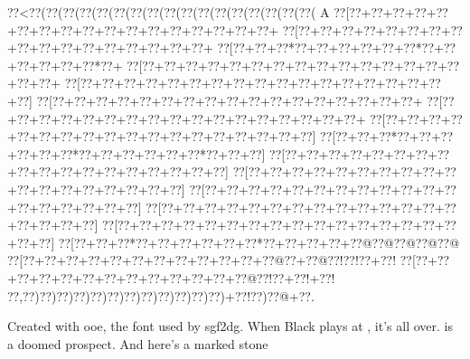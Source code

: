 \documentclass[a5paper]{article}
\begin{document}
\newpage
\begin{center}
{\bgoo
\0??<\0??(\0??(\0??(\0??(\0??(\0??(\0??(\0??(\0??(\0??(\0??(\0??(\0??(\0??(\0??(\0??(\0??(\!  A
\0??[\0??+\0??+\0??+\0??+\0??+\0??+\0??+\0??+\0??+\0??+\0??+\0??+\0??+\0??+\0??+\0??+\0??+
\0??[\0??+\0??+\0??+\0??+\0??+\0??+\0??+\0??+\0??+\0??+\0??+\0??+\0??+\0??+\0??+\0??+\0??+
\0??[\0??+\0??+\0??*\0??+\0??+\0??+\0??+\0??+\0??*\0??+\0??+\0??+\0??+\0??+\0??*\0??+
\0??[\0??+\0??+\0??+\0??+\0??+\0??+\0??+\0??+\0??+\0??+\0??+\0??+\0??+\0??+\0??+\0??+\0??+
\0??[\0??+\0??+\0??+\0??+\0??+\0??+\0??+\0??+\0??+\0??+\0??+\0??+\0??+\0??+\0??+\0??+\0??+\0??]
\0??[\0??+\0??+\0??+\0??+\0??+\0??+\0??+\0??+\0??+\0??+\0??+\0??+\0??+\0??+\0??+\0??+\0??+
\0??[\0??+\0??+\0??+\0??+\0??+\0??+\0??+\0??+\0??+\0??+\0??+\0??+\0??+\0??+\0??+\0??+\0??+
\0??[\0??+\0??+\0??+\0??+\0??+\0??+\0??+\0??+\0??+\0??+\0??+\0??+\0??+\0??+\0??+\0??+\0??+\0??]
\0??[\0??+\0??+\0??*\0??+\0??+\0??+\0??+\0??+\0??*\0??+\0??+\0??+\0??+\0??+\0??*\0??+\0??+\0??]
\0??[\0??+\0??+\0??+\0??+\0??+\0??+\0??+\0??+\0??+\0??+\0??+\0??+\0??+\0??+\0??+\0??+\0??+\0??]
\0??[\0??+\0??+\0??+\0??+\0??+\0??+\0??+\0??+\0??+\0??+\0??+\0??+\0??+\0??+\0??+\0??+\0??+\0??]
\0??[\0??+\0??+\0??+\0??+\0??+\0??+\0??+\0??+\0??+\0??+\0??+\0??+\0??+\0??+\0??+\0??+\0??+\0??]
\0??[\0??+\0??+\0??+\0??+\0??+\0??+\0??+\0??+\0??+\0??+\0??+\0??+\0??+\0??+\0??+\0??+\0??+\0??]
\0??[\0??+\0??+\0??+\0??+\0??+\0??+\0??+\0??+\0??+\0??+\0??+\0??+\0??+\0??+\0??+\0??+\0??+\0??]
\0??[\0??+\0??+\0??*\0??+\0??+\0??+\0??+\0??+\0??*\0??+\0??+\0??+\0??+\0??@\0??@\0??@\0??@\0??@
\0??[\0??+\0??+\0??+\0??+\0??+\0??+\0??+\0??+\0??+\0??+\0??+\0??@\0??+\0??@\0??!\0??!\0??+\0??!
\0??[\0??+\0??+\0??+\0??+\0??+\0??+\0??+\0??+\0??+\0??+\0??+\0??+\0??@\0??!\0??+\0??!+\0??!
\0??,\0??)\0??)\0??)\0??)\0??)\0??)\0??)\0??)\0??)\0??)\0??)\0??)+\0??!\0??)\0??@+\0??.
}

Created with ooe, the font used by sgf2dg. When Black plays at , it's all over.
 is a doomed prospect.  And here's a marked stone 
\end{center}

\newpage
\end{document}
